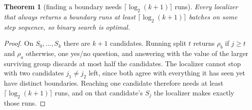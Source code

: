 \documentclass[letterpaper,twocolumn,10pt]{article}
\newtheorem{theorem}{Theorem}
\theoremstyle{definition}
\newif\ifdraft \draftfalse
\newcommand{\todo}[1]{\ifdraft{\textcolor{red}{[\textbf{TODO:} #1]}}\fi}
\begin{document}
\begin{theorem}[finding a boundary needs $\lceil\log_2(k+1)\rceil$ runs]
\label{thm:lb-bsearch}
Every localizer that always returns a boundary runs at least $\lceil\log_2(k+1)\rceil$
batches on some step sequence, so binary search is optimal.
\end{theorem}
\begin{proof}
\todo{should this be removed? moved to appendix? only explained?}
On $S_0,\dots,S_k$ there are $k+1$ candidates. Running split $t$ returns $\rho_b$ if
$j\ge t$ and $\rho_a$ otherwise, one yes/no question, and answering with the value of the
larger surviving group discards at most half the candidates. The localizer cannot stop
with two candidates $j_1\neq j_2$ left, since both agree with everything it has seen yet
have distinct boundaries. Reaching one candidate therefore needs at least
$\lceil\log_2(k+1)\rceil$ runs, and on that candidate's $S_j$ the localizer makes exactly
those runs.
\end{proof}
\end{document}
